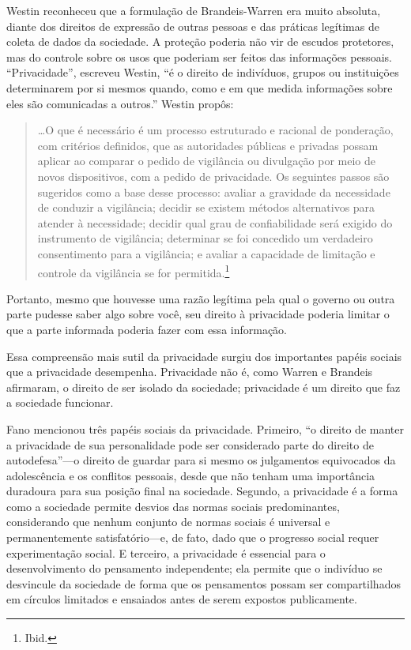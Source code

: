 \documentclass{book}
\begin{document}
Westin reconheceu que a formulação de Brandeis-Warren era muito absoluta,
diante dos direitos de expressão de outras pessoas e das práticas legítimas de
coleta de dados da sociedade. A proteção poderia não vir de escudos protetores,
mas do controle sobre os usos que poderiam ser feitos das informações pessoais.
``Privacidade'', escreveu Westin, ``é o direito de indivíduos, grupos ou
instituições determinarem por si mesmos quando, como e em que medida
informações sobre eles são comunicadas a outros.'' Westin propôs:

\begin{quote}
    \ldots O que é necessário é um processo estruturado e racional de ponderação,
    com critérios definidos, que as autoridades públicas e privadas possam aplicar
    ao comparar o pedido de vigilância ou divulgação por meio de novos
    dispositivos, com a pedido de privacidade. Os seguintes passos são
    sugeridos como a base desse processo: avaliar a gravidade da necessidade de
    conduzir a vigilância; decidir se existem métodos alternativos para atender
    à necessidade; decidir qual grau de confiabilidade será exigido do instrumento
    de vigilância; determinar se foi concedido um verdadeiro consentimento para a
    vigilância; e avaliar a capacidade de limitação e controle da vigilância se
    for permitida.\footnote{Ibid.}
\end{quote}

Portanto, mesmo que houvesse uma razão legítima pela qual o governo ou outra
parte pudesse saber algo sobre você, seu direito à privacidade poderia limitar
o que a parte informada poderia fazer com essa informação.

Essa compreensão mais sutil da privacidade surgiu dos importantes papéis
sociais que a privacidade desempenha. Privacidade não é, como Warren e Brandeis
afirmaram, o direito de ser isolado da sociedade; privacidade é um direito que
faz a sociedade funcionar.

Fano mencionou três papéis sociais da privacidade. Primeiro, ``o direito de
manter a privacidade de sua personalidade pode ser considerado parte do direito
de autodefesa''---o direito de guardar para si mesmo os julgamentos equivocados
da adolescência e os conflitos pessoais, desde que não tenham uma importância
duradoura para sua posição final na sociedade. Segundo, a privacidade é a forma
como a sociedade permite desvios das normas sociais predominantes, considerando
que nenhum conjunto de normas sociais é universal e permanentemente
satisfatório---e, de fato, dado que o progresso social requer experimentação
social. E terceiro, a privacidade é essencial para o desenvolvimento do
pensamento independente; ela permite que o indivíduo se desvincule da sociedade
de forma que os pensamentos possam ser compartilhados em círculos limitados e
ensaiados antes de serem expostos publicamente.
\end{document}

